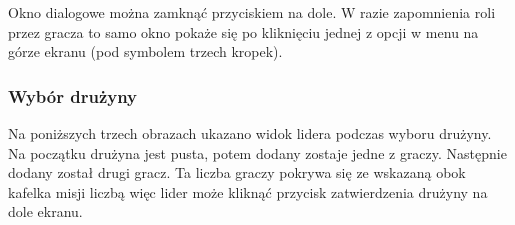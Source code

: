 \documentclass[12pt]{article}
\begin{document}
Okno dialogowe można zamknąć przyciskiem na dole.
W razie zapomnienia roli przez gracza to samo okno pokaże się po kliknięciu jednej z opcji w menu na górze ekranu (pod symbolem trzech kropek).

\subsubsection{Wybór drużyny}
Na poniższych trzech obrazach ukazano widok lidera podczas wyboru drużyny. Na początku drużyna jest pusta, potem dodany zostaje jedne z graczy. Następnie dodany został drugi gracz. Ta liczba graczy pokrywa się ze wskazaną obok kafelka misji liczbą więc lider może kliknąć przycisk zatwierdzenia drużyny na dole ekranu.
\begin{figure}[!htb]
    \centering
    \centering
\end{figure}
\end{document}
